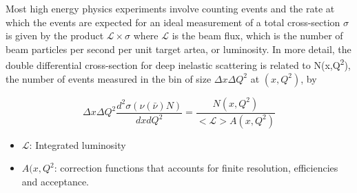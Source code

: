 \documentclass[a4paper,11pt]{article}
\begin{document}
Most high energy physics experiments involve counting events and the rate at which the events are expected for an ideal measurement of a total cross-section \(\sigma\) is given by the product \(\mathcal{L}\times\sigma\) where \(\mathcal{L}\) is the beam flux, which is the number of beam particles per second per unit target artea, or luminosity. In more detail, the double differential cross-section for deep inelastic scattering is related to N(x,Q\textsuperscript{2}), the number of events measured in the bin of size \(\Delta x\Delta Q^2\) at \((x,Q^2)\), by

$$\Delta x\Delta Q^2 \frac{d^2 \sigma(\nu(\bar{\nu}) N)}{dx dQ^2} = \frac{N(x,Q^2)}{<\mathcal{L}>A(x,Q^2)}$$

\begin{itemize}
\item \(\mathcal{L}\): Integrated luminosity
\item \(A(x,Q^2\): correction functions that accounts for finite resolution, efficiencies and acceptance.
\end{itemize}
\end{document}
